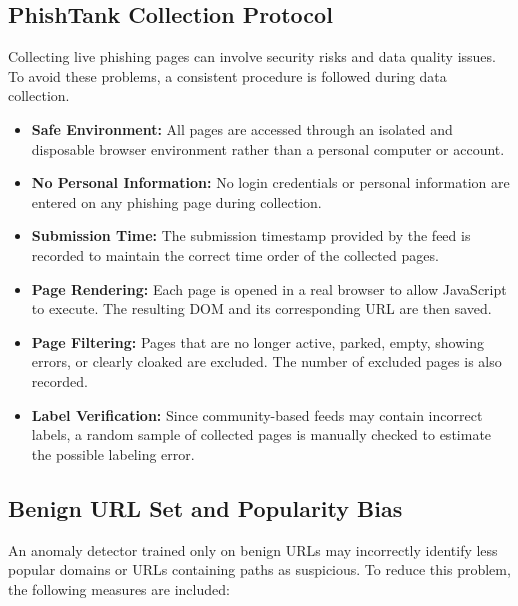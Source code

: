 \documentclass{FastFyp}
\begin{document}
\subsection{PhishTank Collection Protocol}

Collecting live phishing pages can involve security risks and data quality issues. To avoid these problems, a consistent procedure is followed during data collection.

\begin{itemize}
    \item \textbf{Safe Environment:} All pages are accessed through an isolated and disposable browser environment rather than a personal computer or account.

    \item \textbf{No Personal Information:} No login credentials or personal information are entered on any phishing page during collection.

    \item \textbf{Submission Time:} The submission timestamp provided by the feed is recorded to maintain the correct time order of the collected pages.

    \item \textbf{Page Rendering:} Each page is opened in a real browser to allow JavaScript to execute. The resulting DOM and its corresponding URL are then saved.

    \item \textbf{Page Filtering:} Pages that are no longer active, parked, empty, showing errors, or clearly cloaked are excluded. The number of excluded pages is also recorded.

    \item \textbf{Label Verification:} Since community-based feeds may contain incorrect labels, a random sample of collected pages is manually checked to estimate the possible labeling error.
\end{itemize}

\subsection{Benign URL Set and Popularity Bias}

An anomaly detector trained only on benign URLs may incorrectly identify less popular domains or URLs containing paths as suspicious. To reduce this problem, the following measures are included:
\end{document}
